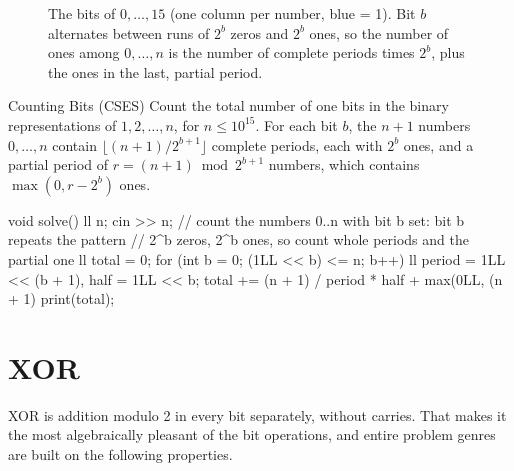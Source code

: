 \begin{figure}[htbp]
\centering
{}
\caption{The bits of $0, \ldots, 15$ (one column per number, blue = 1). Bit $b$ alternates between runs of $2^b$ zeros and
$2^b$ ones, so the number of ones among $0, \ldots, n$ is the number of complete periods times $2^b$, plus the ones in the
last, partial period.}
\label{fig:bitperiods}
\end{figure}

\begin{problem}{Counting Bits (CSES)}
Count the total number of one bits in the binary representations of $1, 2, \ldots, n$, for $n \le 10^{15}$.
\solution For each bit $b$, the $n + 1$ numbers $0, \ldots, n$ contain $\lfloor (n+1)/2^{b+1}\rfloor$ complete periods, each
with $2^b$ ones, and a partial period of $r = (n + 1) \bmod 2^{b+1}$ numbers, which contains $\max(0, r - 2^b)$ ones.
\end{problem}

\begin{code}
void solve() {
    ll n;
    cin >> n;
    // count the numbers 0..n with bit b set: bit b repeats the pattern
    // 2^b zeros, 2^b ones, so count whole periods and the partial one
    ll total = 0;
    for (int b = 0; (1LL << b) <= n; b++) {
        ll period = 1LL << (b + 1), half = 1LL << b;
        total += (n + 1) / period * half + max(0LL, (n + 1) %
    }
    print(total);
}
\end{code}

\section[XOR]{XOR \hfill \gold}\label{sec:xor}

XOR is addition modulo 2 in every bit separately, without carries. That makes it the most algebraically pleasant of the bit
operations, and entire problem genres are built on the following properties.

